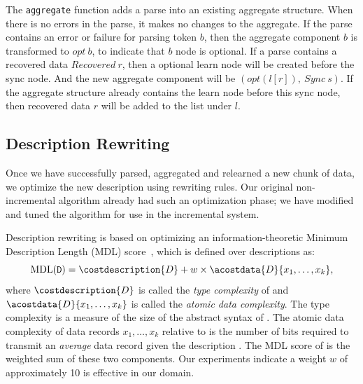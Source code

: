 {The {\tt aggregate} function adds a parse into an existing aggregate structure. When there is
no errors in the parse, it makes no changes to the aggregate. If the parse contains 
an error or failure for parsing token $b$, then the aggregate component 
$b$ is transformed to $opt~ b$, to indicate that $b$ node is optional. 
If a parse contains a recovered data $Recovered~ r$, then
a optional learn node will be created before the sync node. And the new aggregate component will be
$(opt (l [r]),~ Sync~ s)$. If the aggregate structure already contains the learn node before this
sync node, then recovered data $r$ will be added to the list under $l$.


}%



\subsection{Description Rewriting}
Once we have successfully parsed, aggregated and relearned a new
chunk of data, we optimize the new description using rewriting rules.  
Our original non-incremental
algorithm already had such an optimization
phase; we have modified and tuned the algorithm for use in
the incremental system.

Description rewriting is based on optimizing an information-theoretic
Minimum Description Length (MDL) score~\cite{mdlbook}, which is 
defined over descriptions
 as:
\[\mbox{\rm{MDL}(\texttt{D})} = \costdescription{D} + w \times \acostdata{D}{x_1, \ldots, x_k},\]
where $\costdescription{D}$ is called the {\em type complexity} of 
and \\
$\acostdata{D}{x_1, \ldots, x_k}$ is called the {\em atomic data 
complexity}.  The type complexity is a measure of the size of the 
abstract syntax of .  The atomic data 
complexity of data records $x_1, \ldots, x_k$ relative to  
is the number of bits required
to transmit an {\em average} data record given the description .
The MDL score of  is the weighted sum of these two components.  
Our experiments indicate a weight $w$ of approximately 10 is effective
in our domain.

